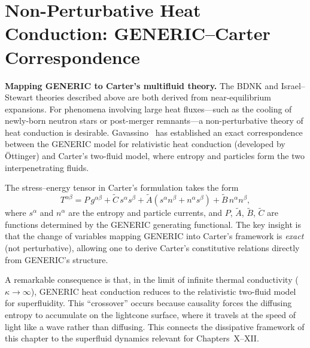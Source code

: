 \section{Non-Perturbative Heat Conduction: GENERIC--Carter Correspondence}
\label{sec:generic-carter}

\begin{relcorrection}
\textbf{Mapping GENERIC to Carter's multifluid theory.}
The BDNK and Israel--Stewart theories described above are both derived
from near-equilibrium expansions.  For phenomena involving large heat
fluxes---such as the cooling of newly-born neutron stars or
post-merger remnants---a non-perturbative theory of heat conduction is
desirable.  Gavassino~\cite{GavassinoGENERICCarter2023} has established
an exact correspondence between the GENERIC model for relativistic heat
conduction (developed by \"Ottinger) and Carter's two-fluid model,
where entropy and particles form the two interpenetrating fluids.

The stress--energy tensor in Carter's formulation takes the form
\begin{equation}
  T^{\alpha\beta} = P\,g^{\alpha\beta}
    + \tilde{C}\,s^\alpha s^\beta
    + \tilde{A}(s^\alpha n^\beta + n^\alpha s^\beta)
    + \tilde{B}\,n^\alpha n^\beta,
  \label{eq:carter-two-fluid}
\end{equation}
where $s^\alpha$ and $n^\alpha$ are the entropy and particle currents,
and $P$, $\tilde{A}$, $\tilde{B}$, $\tilde{C}$ are functions
determined by the GENERIC generating functional.  The key insight is
that the change of variables mapping GENERIC into Carter's framework
is \emph{exact} (not perturbative), allowing one to derive Carter's
constitutive relations directly from GENERIC's structure.

A remarkable consequence is that, in the limit of infinite thermal
conductivity ($\kappa \to \infty$), GENERIC heat conduction reduces
to the relativistic two-fluid model for superfluidity.  This
``crossover'' occurs because causality forces the diffusing entropy
to accumulate on the lightcone surface, where it travels at the
speed of light like a wave rather than diffusing.  This connects
the dissipative framework of this chapter to the superfluid dynamics
relevant for Chapters~X--XII.
\end{relcorrection}
